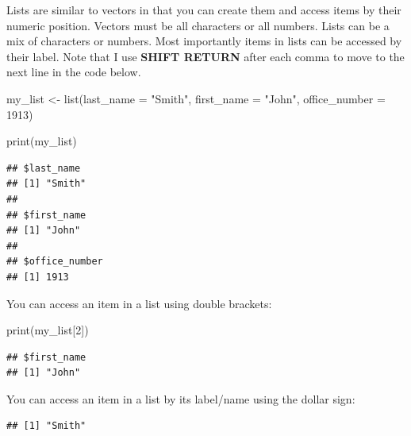 \documentclass[
]{krantz}
\makeatletter
\newenvironment{Shaded}{\begin{snugshade}}{\end{snugshade}}
\newcommand{\AttributeTok}[1]{\textcolor[rgb]{0.61,0.61,0.61}{#1}}
\newcommand{\DecValTok}[1]{\textcolor[rgb]{0.06,0.06,0.06}{#1}}
\newcommand{\FunctionTok}[1]{\textcolor[rgb]{0,0,0}{#1}}
\newcommand{\NormalTok}[1]{#1}
\newcommand{\OtherTok}[1]{\textcolor[rgb]{0.37,0.37,0.37}{#1}}
\newcommand{\SpecialCharTok}[1]{\textcolor[rgb]{0,0,0}{#1}}
\newcommand{\StringTok}[1]{\textcolor[rgb]{0.5,0.5,0.5}{#1}}
\newenvironment{kframe}{%
\medskip{}
\setlength{\fboxsep}{.8em}
 \def\at@end@of@kframe{}%
 \ifinner\ifhmode%
  \def\at@end@of@kframe{\end{minipage}}%
  \begin{minipage}{\columnwidth}%
 \fi\fi%
 \def\FrameCommand##1{\hskip\@totalleftmargin \hskip-\fboxsep
 \colorbox{shadecolor}{##1}\hskip-\fboxsep
     \hskip-\linewidth \hskip-\@totalleftmargin \hskip\columnwidth}%
 \MakeFramed {\advance\hsize-\width
   \@totalleftmargin\z@ \linewidth\hsize
   \@setminipage}}%
 {\par\unskip\endMakeFramed%
 \at@end@of@kframe}
\renewenvironment{Shaded}{\begin{kframe}}{\end{kframe}}
\makeatother
\begin{document}
Lists are similar to vectors in that you can create them and access items by their numeric position. Vectors must be all characters or all numbers. Lists can be a mix of characters or numbers. Most importantly items in lists can be accessed by their label. Note that I use \textbf{SHIFT RETURN} after each comma to move to the next line in the code below.

\begin{Shaded}
\begin{Highlighting}[]
\NormalTok{my\_list }\OtherTok{\textless{}{-}} \FunctionTok{list}\NormalTok{(}\AttributeTok{last\_name =} \StringTok{"Smith"}\NormalTok{,}
                \AttributeTok{first\_name =} \StringTok{"John"}\NormalTok{,}
                \AttributeTok{office\_number =} \DecValTok{1913}\NormalTok{)}

\FunctionTok{print}\NormalTok{(my\_list)}
\end{Highlighting}
\end{Shaded}

\begin{verbatim}
## $last_name
## [1] "Smith"
## 
## $first_name
## [1] "John"
## 
## $office_number
## [1] 1913
\end{verbatim}

You can access an item in a list using double brackets:

\begin{Shaded}
\begin{Highlighting}[]
\FunctionTok{print}\NormalTok{(my\_list[}\DecValTok{2}\NormalTok{])}
\end{Highlighting}
\end{Shaded}

\begin{verbatim}
## $first_name
## [1] "John"
\end{verbatim}

You can access an item in a list by its label/name using the dollar sign:

\begin{Shaded}
\end{Shaded}

\begin{verbatim}
## [1] "Smith"
\end{verbatim}

\begin{Shaded}
\end{Shaded}
\end{document}
